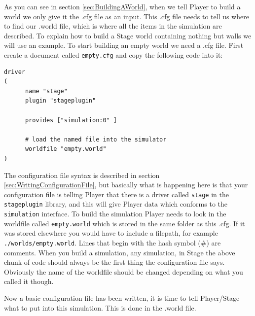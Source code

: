 \documentclass[a4paper]{report}
\newcommand{\plst}{Player/Stage\xspace}
\newcommand{\pl}{Player\xspace}
\begin{document}
As you can see in section \ref{sec:BuildingAWorld}, when we tell \pl to build a world we only give it the .cfg file as an input. This .cfg file needs to tell us where to find our .world file, which is where all the items in the simulation are described. To explain how to build a Stage world containing nothing but walls we will use an example.\newline
To start building an empty world we need a .cfg file. First create a document called \verb|empty.cfg| and copy the following code into it:
\begin{verbatim}
driver
(		
      name "stage"
      plugin "stageplugin"

      provides ["simulation:0" ]

      # load the named file into the simulator
      worldfile "empty.world"	
)
\end{verbatim}
The configuration file syntax is described in section \ref{sec:WritingConfigurationFile}, but basically what is happening here is that your configuration file is telling \pl that there is a driver called \verb|stage| in the \verb|stageplugin| library, and this will give \pl data which conforms to the \verb|simulation| interface. To build the simulation \pl needs to look in the worldfile called \verb|empty.world| which is stored in the same folder as this .cfg. If it was stored elsewhere you would have to include a filepath, for example \verb|./worlds/empty.world|. Lines that begin with the hash symbol (\#) are comments.
When you build a simulation, any simulation, in Stage the above chunk of code should always be the first thing the configuration file says. Obviously the name of the worldfile should be changed depending on what you called it though.

Now a basic configuration file has been written, it is time to tell \plst what to put into this simulation. This is done in the .world file. 
\end{document}
